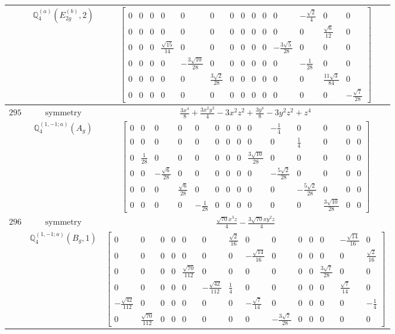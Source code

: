 \documentclass[fleqn,8pt,landscape]{jsarticle}
\begin{document}
\begin{longtable}{ccc}
$  $ & $ \mathbb{Q}_{4}^{(a)}(E_{2g}^{(b)},2) $ & $ \begin{bmatrix} 0 & 0 & 0 & 0 & 0 & 0 & 0 & 0 & 0 & 0 & 0 & - \frac{\sqrt{2}}{4} & 0 & 0 \\ 0 & 0 & 0 & 0 & 0 & 0 & 0 & 0 & 0 & 0 & 0 & 0 & \frac{\sqrt{6}}{12} & 0 \\ 0 & 0 & 0 & \frac{\sqrt{15}}{14} & 0 & 0 & 0 & 0 & 0 & 0 & - \frac{3 \sqrt{5}}{28} & 0 & 0 & 0 \\ 0 & 0 & 0 & 0 & - \frac{3 \sqrt{10}}{28} & 0 & 0 & 0 & 0 & 0 & 0 & - \frac{1}{28} & 0 & 0 \\ 0 & 0 & 0 & 0 & 0 & \frac{3 \sqrt{2}}{28} & 0 & 0 & 0 & 0 & 0 & 0 & \frac{11 \sqrt{3}}{84} & 0 \\ 0 & 0 & 0 & 0 & 0 & 0 & 0 & 0 & 0 & 0 & 0 & 0 & 0 & - \frac{\sqrt{7}}{28} \end{bmatrix} $ \\ \hline
$ 295 $ & $ \text{symmetry} $ & $ \frac{3 x^{4}}{8} + \frac{3 x^{2} y^{2}}{4} - 3 x^{2} z^{2} + \frac{3 y^{4}}{8} - 3 y^{2} z^{2} + z^{4} $ \\
$  $ & $ \mathbb{Q}_{4}^{(1,-1;a)}(A_{g}) $ & $ \begin{bmatrix} 0 & 0 & 0 & 0 & 0 & 0 & 0 & 0 & 0 & - \frac{1}{4} & 0 & 0 & 0 & 0 \\ 0 & 0 & 0 & 0 & 0 & 0 & 0 & 0 & 0 & 0 & \frac{1}{4} & 0 & 0 & 0 \\ 0 & \frac{1}{28} & 0 & 0 & 0 & 0 & 0 & 0 & \frac{3 \sqrt{10}}{28} & 0 & 0 & 0 & 0 & 0 \\ 0 & 0 & - \frac{\sqrt{6}}{28} & 0 & 0 & 0 & 0 & 0 & 0 & - \frac{5 \sqrt{2}}{28} & 0 & 0 & 0 & 0 \\ 0 & 0 & 0 & \frac{\sqrt{6}}{28} & 0 & 0 & 0 & 0 & 0 & 0 & - \frac{5 \sqrt{2}}{28} & 0 & 0 & 0 \\ 0 & 0 & 0 & 0 & - \frac{1}{28} & 0 & 0 & 0 & 0 & 0 & 0 & \frac{3 \sqrt{10}}{28} & 0 & 0 \end{bmatrix} $ \\ \hline
$ 296 $ & $ \text{symmetry} $ & $ \frac{\sqrt{70} x^{3} z}{4} - \frac{3 \sqrt{70} x y^{2} z}{4} $ \\
$  $ & $ \mathbb{Q}_{4}^{(1,-1;a)}(B_{g},1) $ & $ \begin{bmatrix} 0 & 0 & 0 & 0 & 0 & 0 & \frac{\sqrt{2}}{16} & 0 & 0 & 0 & 0 & 0 & - \frac{\sqrt{14}}{16} & 0 \\ 0 & 0 & 0 & 0 & 0 & 0 & 0 & - \frac{\sqrt{14}}{16} & 0 & 0 & 0 & 0 & 0 & \frac{\sqrt{2}}{16} \\ 0 & 0 & 0 & 0 & \frac{\sqrt{70}}{112} & 0 & 0 & 0 & 0 & 0 & 0 & \frac{3 \sqrt{7}}{28} & 0 & 0 \\ 0 & 0 & 0 & 0 & 0 & - \frac{\sqrt{42}}{112} & \frac{1}{4} & 0 & 0 & 0 & 0 & 0 & \frac{\sqrt{7}}{14} & 0 \\ - \frac{\sqrt{42}}{112} & 0 & 0 & 0 & 0 & 0 & 0 & - \frac{\sqrt{7}}{14} & 0 & 0 & 0 & 0 & 0 & - \frac{1}{4} \\ 0 & \frac{\sqrt{70}}{112} & 0 & 0 & 0 & 0 & 0 & 0 & - \frac{3 \sqrt{7}}{28} & 0 & 0 & 0 & 0 & 0 \end{bmatrix} $ \\ \hline

\end{longtable}
\end{document}
